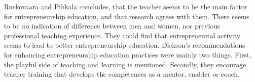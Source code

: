 Ruskovaara and Pihkala \citep{ruskovaara} concludes, that the teacher seems to be the main factor for entrepreneurship education, and that research agrees with them. There seems to be no indication of difference between men and women, nor previous professional teaching experience. They could find that entrepreneurial activity seems to lead to better entrepreneurship education. Dickson's recommendations for enhancing entrepreneurship education practices were mainly two things. First, the playful side of teaching and learning is mentioned. Secondly, they encourage teacher training that develops the competences as a mentor, enabler or coach. \citep{dickson}
